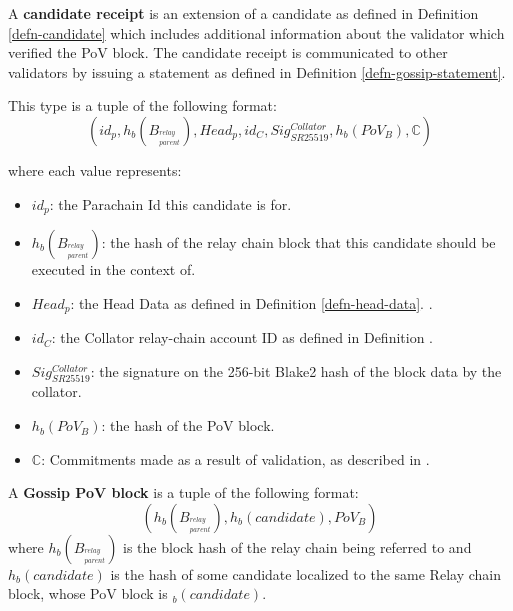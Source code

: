 \begin{definition}
  \label{defn-candidate-receipt}
  A \textbf{candidate receipt} is an extension of a candidate as defined in Definition \ref{defn-candidate}
  which includes additional information about the validator which verified the PoV block.
  The candidate receipt is communicated to other validators by issuing a statement as defined in Definition \ref{defn-gossip-statement}.
  \newline

  This type is a tuple of the following format:
  \[
  (id_p, h_b({B_{^{relay}_{parent}}}), Head_p, id_{C}, Sig^{Collator}_{SR25519}, h_b({PoV_B}), \mathbb{C})
  \]

  where each value represents:
  \begin{itemize}
    \item $id_p$: the Parachain Id this candidate is for.
    \item $h_b({B_{^{relay}_{parent}}})$: the hash of the relay chain block that this
    candidate should be executed in the context of.
    \item $Head_p$: the Head Data as defined in Definition \ref{defn-head-data}.
    .
    \item $id_C$: the Collator relay-chain account ID as defined in Definition
    .
    \item $Sig^{Collator}_{SR25519}$: the signature on the 256-bit Blake2 hash
    of the block data by the collator.
    \item $h_b({PoV_B})$: the hash of the PoV block.
    \item $\mathbb{C}$: Commitments made as a result of validation, as described in
    .
  \end{itemize}
\end{definition}

\begin{definition}
  \label{defn-pov-block}
  A \textbf{Gossip PoV block} is a tuple of the following format:
  \[
  (h_b(B_{^{relay}_{parent}}), h_b(candidate), PoV_B)
  \]
  where $h_b(B_{^{relay}_{parent}})$ is the block hash of the relay chain being
  referred to and $h_b(candidate)$ is the hash of some candidate localized to
  the same Relay chain block, whose PoV block is $_b(candidate)$.
\end{definition}

